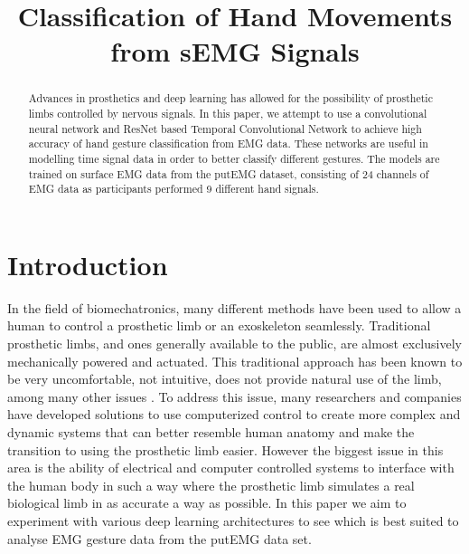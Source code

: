 \documentclass[conference]{IEEEtran}
\begin{document}
\title{Classification of Hand Movements from sEMG Signals}

\author{
\and
{}
\and
{}
}

\maketitle

\begin{abstract}
Advances in prosthetics and deep learning has allowed for the possibility of prosthetic limbs controlled by nervous signals. In this paper, we attempt to use a convolutional neural network and ResNet based Temporal Convolutional Network to achieve high accuracy of hand gesture classification from EMG data. These networks are useful in modelling time signal data in order to better classify different gestures. The models are trained on surface EMG data from the putEMG dataset, consisting of 24 channels of EMG data as participants performed 9 different hand signals. 
\end{abstract}



\section{Introduction}
In the field of biomechatronics, many different methods have been used to allow a human to control a prosthetic limb or an exoskeleton seamlessly. Traditional prosthetic limbs, and ones generally available to the public, are almost exclusively mechanically powered and actuated. This traditional approach has been known to be very uncomfortable, not intuitive, does not provide natural use of the limb, among many other issues \cite{b3}. To address this issue, many researchers and companies have developed solutions to use computerized control to create more complex and dynamic systems that can better resemble human anatomy and make the transition to using the prosthetic limb easier. However the biggest issue in this area is the ability of electrical and computer controlled systems to interface with the human body in such a way where the prosthetic limb simulates a real biological limb in as accurate a way as possible. In this paper we aim to experiment with various deep learning architectures to see which is best suited to analyse EMG gesture data from the putEMG data set.
\end{document}
